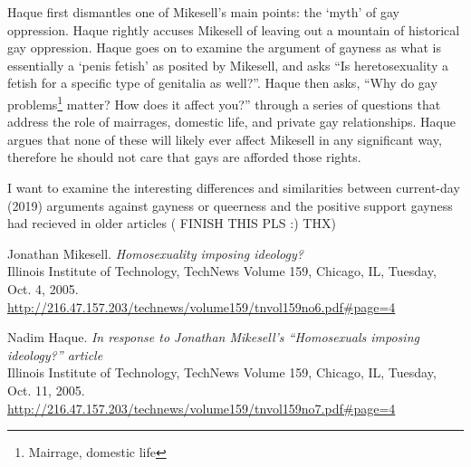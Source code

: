 \documentclass[a4paper,12pt]{article}
\begin{document}
	Haque first dismantles one of Mikesell's main points: the `myth' of gay oppression. Haque rightly accuses Mikesell of leaving out a mountain of historical gay oppression. Haque goes on to examine the argument of gayness as what is essentially a `penis fetish' as posited by Mikesell, and asks ``Is heretosexuality a fetish for a specific type of genitalia as well?''. Haque then asks, ``Why do gay problems\footnote{Mairrage, domestic life} matter? How does it affect you?'' through a series of questions that address the role of mairrages, domestic life, and private gay relationships. Haque argues that none of these will likely ever affect Mikesell in any significant way, therefore he should not care that gays are afforded those rights.
	

	I want to examine the interesting differences and similarities between current-day (2019) arguments against gayness or queerness and the positive support gayness had recieved in older articles ( FINISH THIS PLS :) THX)


\begin{thebibliography}{9}

Jonathan Mikesell.
\textit{Homosexuality imposing ideology?} \\
Illinois Institute of Technology, TechNews Volume 159, Chicago, IL, Tuesday, Oct. 4, 2005.
\url{http://216.47.157.203/technews/volume159/tnvol159no6.pdf\#page=4}

Nadim Haque.
\textit{In response to Jonathan Mikesell's “Homosexuals imposing ideology?” article} \\
Illinois Institute of Technology, TechNews Volume 159, Chicago, IL, Tuesday, Oct. 11, 2005.
\url{http://216.47.157.203/technews/volume159/tnvol159no7.pdf\#page=4}


\end{thebibliography}


\newpage

\end{document}

